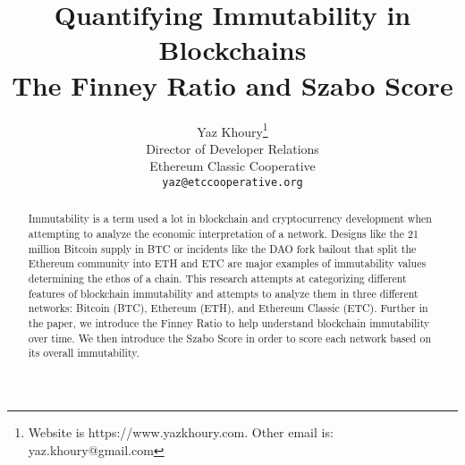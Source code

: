 \documentclass{article}
\title{
        Quantifying Immutability in Blockchains\\
        \large The Finney Ratio and Szabo Score
}
\subtitle{}
\author{
        Yaz Khoury\thanks{Website is https://www.yazkhoury.com. Other email is: yaz.khoury@gmail.com} \\
        Director of Developer Relations\\
        Ethereum Classic Cooperative\\
        \texttt{yaz@etccooperative.org} \\
}
\begin{document}
\maketitle

\begin{abstract}
Immutability is a term used a lot in blockchain and cryptocurrency development when attempting to analyze the economic interpretation of a network. Designs like the 21 million Bitcoin supply in BTC or incidents
like the DAO fork bailout that split the Ethereum community into ETH and ETC are major examples of immutability values determining the ethos of a chain. This research attempts at categorizing different features
of blockchain immutability and attempts to analyze them in three different networks: Bitcoin (BTC), Ethereum (ETH), and Ethereum Classic (ETC). Further in the paper, we introduce the Finney Ratio to help understand
blockchain immutability over time. We then introduce the Szabo Score in order to score each network based on its overall immutability.
\end{abstract}
\end{document}
